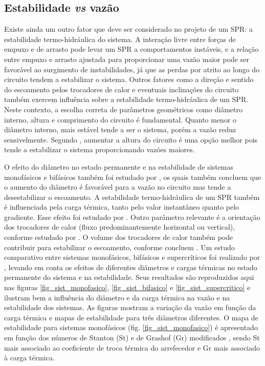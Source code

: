 \documentclass[a4paper,portuguese,10pt]{article}
\begin{document}
\subsection{Estabilidade {\it vs} vazão}

Existe ainda um outro fator que deve ser considerado no projeto de um SPR: a estabilidade termo-hidráulica do sistema. A interação livre entre forças de empuxo e de arrasto pode levar um SPR a comportamentos instáveis, e a relação entre empuxo e arrasto ajustada para proporcionar uma vazão maior pode ser favorável ao surgimento de instabilidades, já que as perdas por atrito ao longo do circuito tendem a estabilizar o sistema. Outros fatores como a direção e sentido do escoamento pelos trocadores de calor e eventuais inclinações do circuito também exercem influência sobre a estabilidade termo-hidráulica de um SPR. Neste contexto, a escolha correta de parâmetros geométricos como diâmetro interno, altura e comprimento do circuito é fundamental. Quanto menor o diâmetro interno, mais estável tende a ser o sistema, porém a vazão reduz sensivelmente. Segundo \citet{BASU13b}, aumentar a altura do circuito é uma opção melhor pois tende a estabilizar o sistema proporcionando vazões maiores.

O efeito do diâmetro no estado permanente e na estabilidade de sistemas monofásicos e bifásicos também foi estudado por \citet{VIJAYAN08}, os quais também concluem que o aumento do diâmetro é favorável para a vazão no circuito mas tende a desestabilizar o escoamento. A estabilidade termo-hidráulica de um SPR também é influenciada pela carga térmica, tanto pelo valor instantâneo quanto pelo gradiente. Esse efeito foi estudado por \citet{BASU13a}. Outro parâmetro relevante é a orientação dos trocadores de calor (fluxo predominantemente horizontal ou vertical), conforme estudado por \citet{VIJAYAN07}. O volume dos trocadores de calor também pode contribuir para estabilizar o escoamento, conforme concluem \citet{TJOEN12}. Um estudo comparativo entre sistemas monofásicos, bifásicos e supercríticos foi realizado por \citet{VIJAYAN10}, levando em conta os efeitos de diferentes diâmetros e cargas térmicas no estado permanente do sistema e na estabilidade. Seus resultados são reproduzidos aqui nas figuras \ref{fig_sist_monofasico}, \ref{fig_sist_bifasico} e \ref{fig_sist_supercritico} e ilustram bem a influência do diâmetro e da carga térmica na vazão e na estabilidade dos sistemas. As figuras mostram a variação da vazão em função da carga térmica e mapas de estabilidade para três diâmetros diferentes. O mapa de estabilidade para sistemas monofásicos (fig. \ref{fig_sist_monofasico}) é apresentado em função dos números de Stanton (St) e de Grashof (Gr) modificados \cite{VIJAYAN94}, sendo St mais associado ao coeficiente de troca térmica do arrefecedor e Gr mais associado à carga térmica.
\end{document}
